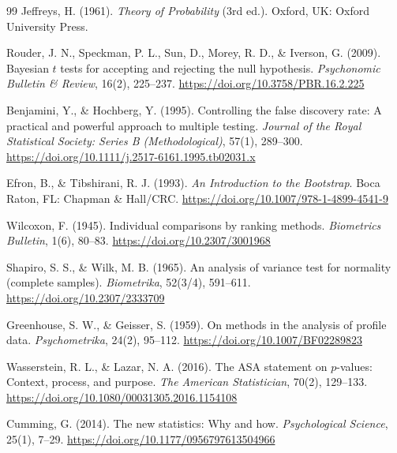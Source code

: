 \documentclass[10pt,twocolumn,a4paper]{article}
\theoremstyle{definition}
\theoremstyle{plain}
\begin{document}
\begin{thebibliography}{99}
Jeffreys, H. (1961).
\newblock \textit{Theory of Probability} (3rd ed.).
\newblock Oxford, UK: Oxford University Press.

Rouder, J. N., Speckman, P. L., Sun, D., Morey, R. D., \& Iverson, G. (2009).
\newblock Bayesian $t$ tests for accepting and rejecting the null hypothesis.
\newblock \textit{Psychonomic Bulletin \& Review}, 16(2), 225--237. \url{https://doi.org/10.3758/PBR.16.2.225}

Benjamini, Y., \& Hochberg, Y. (1995).
\newblock Controlling the false discovery rate: A practical and powerful approach to multiple testing.
\newblock \textit{Journal of the Royal Statistical Society: Series B (Methodological)}, 57(1), 289--300. \url{https://doi.org/10.1111/j.2517-6161.1995.tb02031.x}

Efron, B., \& Tibshirani, R. J. (1993).
\newblock \textit{An Introduction to the Bootstrap}.
\newblock Boca Raton, FL: Chapman \& Hall/CRC. \url{https://doi.org/10.1007/978-1-4899-4541-9}

Wilcoxon, F. (1945).
\newblock Individual comparisons by ranking methods.
\newblock \textit{Biometrics Bulletin}, 1(6), 80--83. \url{https://doi.org/10.2307/3001968}

Shapiro, S. S., \& Wilk, M. B. (1965).
\newblock An analysis of variance test for normality (complete samples).
\newblock \textit{Biometrika}, 52(3/4), 591--611. \url{https://doi.org/10.2307/2333709}

Greenhouse, S. W., \& Geisser, S. (1959).
\newblock On methods in the analysis of profile data.
\newblock \textit{Psychometrika}, 24(2), 95--112. \url{https://doi.org/10.1007/BF02289823}

Wasserstein, R. L., \& Lazar, N. A. (2016).
\newblock The ASA statement on $p$-values: Context, process, and purpose.
\newblock \textit{The American Statistician}, 70(2), 129--133. \url{https://doi.org/10.1080/00031305.2016.1154108}

Cumming, G. (2014).
\newblock The new statistics: Why and how.
\newblock \textit{Psychological Science}, 25(1), 7--29. \url{https://doi.org/10.1177/0956797613504966}


\end{thebibliography}
\end{document}
